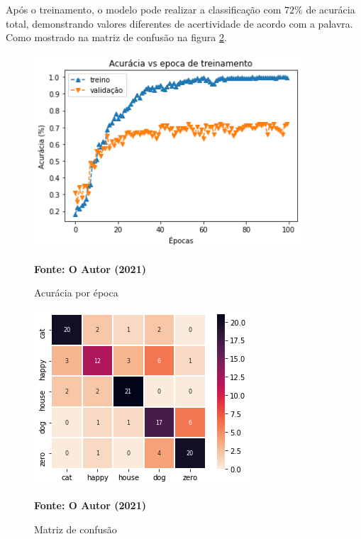 \documentclass[
	12pt,				%
	openright,			%
	oneside,			%
	a4paper,			%
	chapter=TITLE,		%
	english,			%
	french,				%
	spanish,			%
	brazil				%
	]{abntex2}
\theoremstyle{definition}
\begin{document}
Após o treinamento, o modelo pode realizar a classificação com $72\%$ de acurácia total, demonstrando valores diferentes de acertividade de acordo com a palavra. Como mostrado na matriz de confusão na figura \ref{fig:mtr}.

\begin{figure}[!h]
	\caption{Acurácia por época}
	\label{fig:trans_pipe}
	\centering
	\includegraphics[width=10cm]{acc.png} \\
	\begin{small}\textbf{Fonte: O Autor (2021)}\end{small}
\end{figure}

\begin{figure}[!h]
	\caption{Matriz de confusão}
	\label{fig:mtr}
	\centering
	\includegraphics{mtr.png} \\
	\begin{small}\textbf{Fonte: O Autor (2021)}\end{small}
\end{figure}
\end{document}
